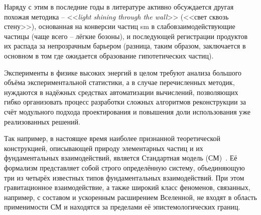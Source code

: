 Наряду с этим в последние годы в литературе активно обсуждается
другая похожая методика -- <<\emph{light shining through the wall}>>
(<<свет сквозь стену>>), основанная на конверсии частиц \acrshort{sm}
в слабовзаимодействующие частицы (чаще всего -- лёгкие бозоны), и
последующей регистрации продуктов их распада за непрозрачным
барьером (разница, таким образом, заключается в основном в том где
ожидается образование гипотетических частиц).

Эксперименты в физике высоких энергий в целом требуют
анализа большого объёма экспериментальной статистики, а в случае
перечисленных методик, нуждаются в надёжных средствах автоматизации вычислений,
позволяющих гибко организовать процесс разработки сложных алгоритмов
реконструкции за счёт модульного подхода проектирования и повышения доли
использования уже реализованных решений.

Так например, в настоящее время наиболее признанной теоретической конструкцией,
описывающей природу элементарных частиц и их фундаментальных
взаимодействий, является Стандартная модель (СМ)~\cite{standard-model-maioli}.
Её формализм представляет собой строго определённую систему, объединяющую
три из четырёх известных типов фундаментальных взаимодействий. При
этом гравитационное взаимодействие, а также широкий класс феноменов,
связанных, например, с составом и ускоренным расширением Вселенной,
не входят в область применимости СМ и находятся за пределами её
эпистемологических границ.

